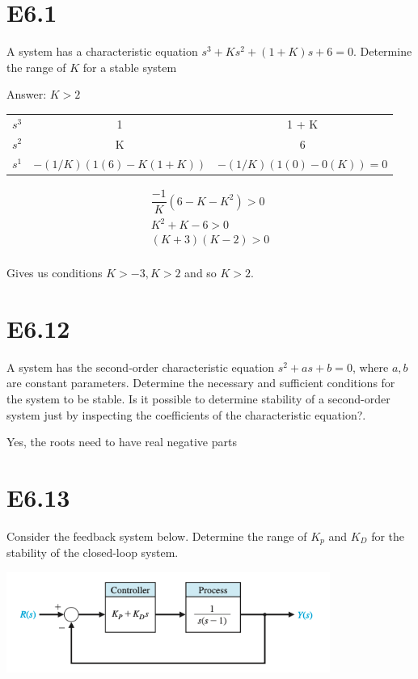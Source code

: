 \documentclass[11pt]{article}
\begin{document}
\section{E6.1}

A system has a characteristic equation $s^3 + Ks^2 + (1 + K)s + 6 = 0$. Determine the range of $K$ for a stable system

Answer: $K > 2$

\begin{table}[h]
  \centering
  \begin{tabular}{|c|c|c|}
  \hline
  $s^3$ & 1 & 1 + K \\
  $s^2$ & K & 6 \\
  $s^1$ & $- (1/K) (1(6) - K (1 + K))$ & $- (1 / K) (1(0) - 0(K)) = 0$ \\
  \hline
  \end{tabular}
\end{table}

\begin{align*}
  \dfrac{-1}{K} (6 - K - K^2) > 0 \\
  K^2 + K - 6 > 0 \\
  (K + 3)(K - 2) > 0 \\  
\end{align*}

Gives us conditions $K > -3, K > 2$ and so $K > 2$.


\section{E6.12}

A system has the second-order characteristic equation $s^2 + as + b = 0$, where $a, b$ are constant parameters. Determine the necessary and sufficient conditions for the system to be stable. Is it possible to determine stability of a second-order system just by inspecting the coefficients of the characteristic equation?.

Yes, the roots need to have real negative parts

\section{E6.13}

Consider the feedback system below. Determine the range of $K_p$ and $K_D$ for the stability of the closed-loop system.

\includegraphics[width=300pt]{e6.13.png}
\end{document}
